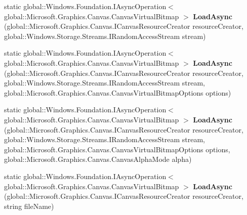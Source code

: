 \begin{DoxyCompactItemize}
static global\+::\+Windows.\+Foundation.\+I\+Async\+Operation$<$ global\+::\+Microsoft.\+Graphics.\+Canvas.\+Canvas\+Virtual\+Bitmap $>$ {\bfseries Load\+Async} (global\+::\+Microsoft.\+Graphics.\+Canvas.\+I\+Canvas\+Resource\+Creator resource\+Creator, global\+::\+Windows.\+Storage.\+Streams.\+I\+Random\+Access\+Stream stream)
\item 
\mbox{\label{class_microsoft_1_1_graphics_1_1_canvas_1_1_canvas_virtual_bitmap_a8cdd19fd36f49f203d6c0998ace732d1}} 
static global\+::\+Windows.\+Foundation.\+I\+Async\+Operation$<$ global\+::\+Microsoft.\+Graphics.\+Canvas.\+Canvas\+Virtual\+Bitmap $>$ {\bfseries Load\+Async} (global\+::\+Microsoft.\+Graphics.\+Canvas.\+I\+Canvas\+Resource\+Creator resource\+Creator, global\+::\+Windows.\+Storage.\+Streams.\+I\+Random\+Access\+Stream stream, global\+::\+Microsoft.\+Graphics.\+Canvas.\+Canvas\+Virtual\+Bitmap\+Options options)
\item 
\mbox{\label{class_microsoft_1_1_graphics_1_1_canvas_1_1_canvas_virtual_bitmap_abba7eac1de7fc7da41f8546a18aef233}} 
static global\+::\+Windows.\+Foundation.\+I\+Async\+Operation$<$ global\+::\+Microsoft.\+Graphics.\+Canvas.\+Canvas\+Virtual\+Bitmap $>$ {\bfseries Load\+Async} (global\+::\+Microsoft.\+Graphics.\+Canvas.\+I\+Canvas\+Resource\+Creator resource\+Creator, global\+::\+Windows.\+Storage.\+Streams.\+I\+Random\+Access\+Stream stream, global\+::\+Microsoft.\+Graphics.\+Canvas.\+Canvas\+Virtual\+Bitmap\+Options options, global\+::\+Microsoft.\+Graphics.\+Canvas.\+Canvas\+Alpha\+Mode alpha)
\item 
\mbox{\label{class_microsoft_1_1_graphics_1_1_canvas_1_1_canvas_virtual_bitmap_a8596f4617ef7a7e9c1a1464d4674e40c}} 
static global\+::\+Windows.\+Foundation.\+I\+Async\+Operation$<$ global\+::\+Microsoft.\+Graphics.\+Canvas.\+Canvas\+Virtual\+Bitmap $>$ {\bfseries Load\+Async} (global\+::\+Microsoft.\+Graphics.\+Canvas.\+I\+Canvas\+Resource\+Creator resource\+Creator, string file\+Name)
\item 
\mbox{\label{class_microsoft_1_1_graphics_1_1_canvas_1_1_canvas_virtual_bitmap_a8f0bf16c94a9957cd9b4f30b7c8369f8}} 

\end{DoxyCompactItemize}
